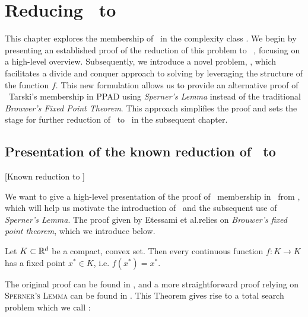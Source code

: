 \setchapterpreamble[u]{\margintoc}
\chapter{Reducing \Tarski\ to \PPAD}
\label{ch:ppad_reduction}

This chapter explores the membership of \Tarski\ in the complexity class \PPAD. We begin by presenting an established proof of the reduction of this problem to \Brouwer~, focusing on a high-level overview. Subsequently, we introduce a novel problem, \Tarskistar, which facilitates a divide and conquer approach to solving \Tarski by leveraging the structure of the function $f$. This new formulation allows us to provide an alternative proof of \ Tarski's membership in PPAD using \textit{Sperner's Lemma} instead of the traditional \textit{Brouwer's Fixed Point Theorem}. This approach simplifies the proof and sets the stage for further reduction of \Tarskistar\ to \EOPL\ in the subsequent chapter.

\section{Presentation of the known reduction of \Tarski\ to \PPAD}[Known reduction to \PPAD]

We want to give a high-level presentation of the proof of \Tarski\ membership in \PPAD\ from , which will help us motivate the introduction of \Tarskistar\ and the subsequent use of \textit{Sperner's Lemma}. The proof given by Etessami et al.\@ relies on \textit{Brouwer's fixed point theorem}, which we introduce below.

\begin{theorem}
    Let $K \subset \mathbb{R}^d$ be a compact, convex set. Then every continuous function $f : K \rightarrow K$ has a fixed point $x^*	\in K$, i.e. $f(x^*) = x^*$.
\end{theorem}

The original proof can be found in , and a more straightforward proof relying on \textsc{Sperner's Lemma} can be found in . This Theorem gives rise to a total search problem which we call \Brouwer:


